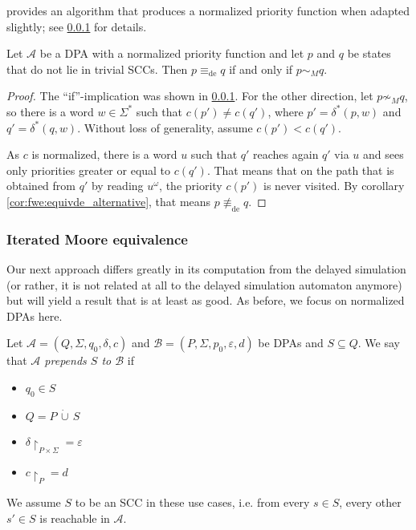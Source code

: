 \cite{} provides an algorithm that produces a normalized priority function when adapted slightly; see \ref{} for details. 


\begin{lem}
	Let $\mathcal{A}$ be a DPA with a normalized priority function and let $p$ and $q$ be states that do not lie in trivial SCCs. Then $p \equiv_\text{de} q$ if and only if $p \sim_M q$.
\end{lem}

\begin{proof}
	The \enquote{if}-implication was shown in \ref{}. For the other direction, let $p \not\sim_M q$, so there is a word $w \in \Sigma^*$ such that $c(p') \neq c(q')$, where $p' = \delta^*(p, w)$ and $q' = \delta^*(q, w)$. Without loss of generality, assume $c(p') < c(q')$.
	
	As $c$ is normalized, there is a word $u$ such that $q'$ reaches again $q'$ via $u$ and sees only priorities greater or equal to $c(q')$. That means that on the path that is obtained from $q'$ by reading $u^\omega$, the priority $c(p')$ is never visited. By corollary \ref{cor:fwe:equivde_alternative}, that means $p \not\equiv_\text{de} q$.
\end{proof}


\subsubsection{Iterated Moore equivalence}
Our next approach differs greatly in its computation from the delayed simulation (or rather, it is not related at all to the delayed simulation automaton anymore) but will yield a result that is at least as good. As before, we focus on normalized DPAs here.

\begin{defn}
	Let $\mathcal{A} = (Q, \Sigma, q_0, \delta, c)$ and $\mathcal{B} = (P, \Sigma, p_0, \varepsilon, d)$ be DPAs and $S \subseteq Q$. We say that \emph{$\mathcal{A}$ prepends $S$ to $\mathcal{B}$} if 
	\begin{itemize}
		\item $q_0 \in S$
		\item $Q = P \,\dot{\cup}\, S$
		\item $\delta\upharpoonright_{P \times \Sigma} = \varepsilon$
		\item $c\upharpoonright_P = d$
	\end{itemize}
	
	We assume $S$ to be an SCC in these use cases, i.e. from every $s \in S$, every other $s' \in S$ is reachable in $\mathcal{A}$.
\end{defn} 

